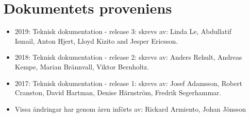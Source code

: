 \documentclass[a4paper,12pt]{article}
\begin{document}
\section{Dokumentets proveniens}
\label{sec:provenance}

\begin{itemize}
\item 2019: Teknisk dokumentation - release 3: skrevs av: Linda Le, Abdullatif Ismail, Anton Hjert, Lloyd Kizito and Jesper Ericsson.
\item 2018: Teknisk dokumentation - release 2: skrevs av: Anders Rehult, Andreas Kempe, Marian Brännvall, Viktor Bernholtz.
\item 2017: Teknisk dokumentation - release 1: skrevs av: Josef Adamsson, Robert Cranston, David Hartman, Denise Härnström, Fredrik Segerhammar.
\item Vissa ändringar har genom åren införts av: Rickard Armiento, Johan Jönsson
\end{itemize}
\end{document}
